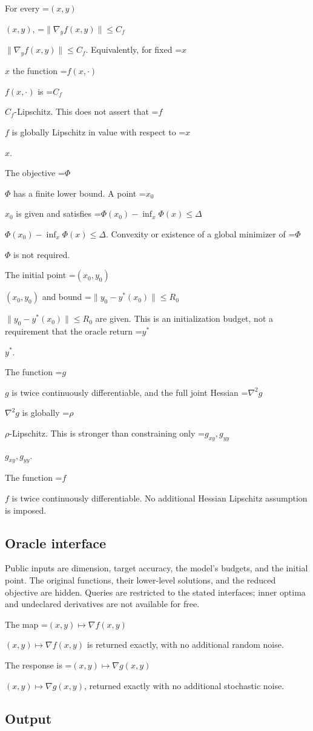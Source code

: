 \documentclass[10pt,a4paper]{article}
\newcommand{\AtlasMath}[1]{\par\begingroup\centering\setbox0=\hbox{$\displaystyle #1$}\ifdim\wd0>1.4\linewidth\typeout{ATLAS WIDE FORMULA: \the\wd0}\fi\ifdim\wd0>\linewidth\resizebox{\linewidth}{!}{\box0}\else\box0\fi\par\endgroup}
\newcommand{\AtlasInlineMath}[1]{\begingroup\setbox0=\hbox{$#1$}\ifdim\wd0>.4\linewidth\endgroup\AtlasMath{#1}\else\endgroup$#1$\fi}
\begin{document}
For every \AtlasInlineMath{(x,y)}, \AtlasInlineMath{\|\nabla_y f(x,y)\|\le C_f}. Equivalently, for fixed \AtlasInlineMath{x} the function \AtlasInlineMath{f(x,\cdot)} is \AtlasInlineMath{C_f}-Lipschitz. This does not assert that \AtlasInlineMath{f} is globally Lipschitz in value with respect to \AtlasInlineMath{x}.



The objective \AtlasInlineMath{\Phi} has a finite lower bound. A point \AtlasInlineMath{x_0} is given and satisfies \AtlasInlineMath{\Phi(x_0)-\inf_x\Phi(x)\le\Delta}. Convexity or existence of a global minimizer of \AtlasInlineMath{\Phi} is not required.



The initial point \AtlasInlineMath{(x_0,y_0)} and bound \AtlasInlineMath{\|y_0-y^*(x_0)\|\le R_0} are given. This is an initialization budget, not a requirement that the oracle return \AtlasInlineMath{y^*}.



The function \AtlasInlineMath{g} is twice continuously differentiable, and the full joint Hessian \AtlasInlineMath{\nabla^2g} is globally \AtlasInlineMath{\rho}-Lipschitz. This is stronger than constraining only \AtlasInlineMath{g_{xy},g_{yy}}.



The function \AtlasInlineMath{f} is twice continuously differentiable. No additional Hessian Lipschitz assumption is imposed.



\subsection{Oracle interface}


Public inputs are dimension, target accuracy, the model's budgets, and the initial point. The original functions, their lower-level solutions, and the reduced objective are hidden. Queries are restricted to the stated interfaces; inner optima and undeclared derivatives are not available for free.



The map \AtlasInlineMath{(x,y)\mapsto\nabla f(x,y)} is returned exactly, with no additional random noise.



The response is \AtlasInlineMath{(x,y)\longmapsto \nabla g(x,y)}, returned exactly with no additional stochastic noise.



\subsection{Output}
\end{document}

